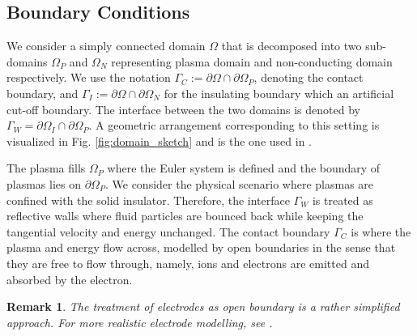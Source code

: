 \documentclass{article}
\newtheorem*{remark}{Remark}
\begin{document}
\subsection{Boundary Conditions} \label{sec:BC}

We consider a simply connected domain $\Omega$ that is decomposed into two sub-domains $\Omega_P$ and $\Omega_N$ representing plasma domain and non-conducting domain respectively. We use the notation $\Gamma_C := \partial\Omega \cap \partial\Omega_P$, denoting the contact boundary, and $\Gamma_I := \partial\Omega \cap \partial\Omega_N$ for the insulating boundary which an artificial cut-off boundary. The interface between the two domains is denoted by $\Gamma_W = \partial\Omega_I \cap \partial\Omega_P$. A geometric arrangement corresponding to this setting is visualized in Fig. \ref{fig:domain_sketch} and is the one used in \cite[][ch. 1, sec. 4]{fuchs_2021}. 

The plasma fills $\Omega_P$ where the Euler system is defined and the boundary of plasmas lies on $\partial\Omega_P$. We consider the physical scenario where plasmas are confined with the solid insulator. Therefore, the interface $\Gamma_W$ is treated as reflective walls where fluid particles are bounced back while keeping the tangential velocity and energy unchanged. The contact boundary $\Gamma_C$ is where the plasma and energy flow across, modelled by open boundaries in the sense that they are free to flow through, namely, ions and electrons are emitted and absorbed by the electron. 

\begin{remark}
    The treatment of electrodes as open boundary is a rather simplified approach. For more realistic electrode modelling, see \cite{godyak_1990, parker_1993}.
\end{remark}
\end{document}
